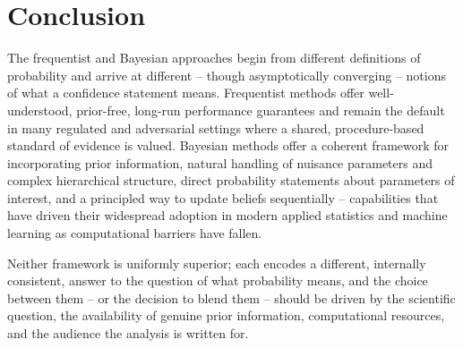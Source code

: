 \documentclass[11pt,a4paper]{article}
\begin{document}
\section{Conclusion}
The frequentist and Bayesian approaches begin from different definitions of probability and arrive at different -- though asymptotically converging -- notions of what a confidence statement means. Frequentist methods offer well-understood, prior-free, long-run performance guarantees and remain the default in many regulated and adversarial settings where a shared, procedure-based standard of evidence is valued. Bayesian methods offer a coherent framework for incorporating prior information, natural handling of nuisance parameters and complex hierarchical structure, direct probability statements about parameters of interest, and a principled way to update beliefs sequentially -- capabilities that have driven their widespread adoption in modern applied statistics and machine learning as computational barriers have fallen.

Neither framework is uniformly superior; each encodes a different, internally consistent, answer to the question of what probability means, and the choice between them -- or the decision to blend them -- should be driven by the scientific question, the availability of genuine prior information, computational resources, and the audience the analysis is written for.
\end{document}
